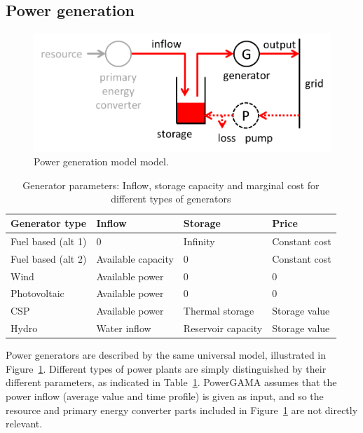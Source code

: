 \documentclass{article}
\begin{document}
\subsection{Power generation}

\begin{figure}
\centering
\includegraphics[scale=0.6]{generator_model4.png}
\caption{Power generation model model.}
\label{fig:generator_model}
\end{figure}

\begin{table}
\caption{Generator parameters: Inflow, storage capacity and marginal cost for different types of generators}
\label{tab:generator_parameters}
\begin{tabular}{llll}
\hline
Generator type & Inflow & Storage & Price \\ 
\hline
Fuel based (alt 1) & 0 & Infinity & Constant cost \\
Fuel based (alt 2) & Available capacity & 0 & Constant cost\\
Wind & Available power & 0 & 0 \\
Photovoltaic & Available power & 0 & 0 \\
CSP & Available power & Thermal storage & Storage value \\
Hydro & Water inflow & Reservoir capacity & Storage value \\
\hline
\end{tabular}
\end{table}

Power generators are described by the same universal model, illustrated in Figure~\ref{fig:generator_model}.
Different types of power plants are simply distinguished by their different parameters, as indicated in Table~\ref{tab:generator_parameters}.
PowerGAMA assumes that the power inflow (average value and time profile) is given as input, and so the resource and primary energy converter parts included in Figure~\ref{fig:generator_model} are not directly relevant. 
\end{document}
